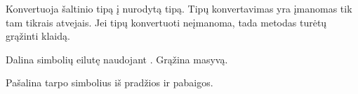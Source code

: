 \documentclass[letterpaper,10pt,lithuanian]{sphinxmanual}
\begin{document}
\begin{fulllineitems}
\begin{fulllineitems}
\end{fulllineitems}


\begin{fulllineitems}
\label{\detokenize{formules:cast}}
\pysigstartsignatures
\pysiglinewithargsret
{}
{}
{}
\pysigstopsignatures
\sphinxAtStartPar
Konvertuoja šaltinio tipą į nurodytą  tipą. Tipų konvertavimas yra
įmanomas tik tam tikrais atvejais. Jei tipų konvertuoti neįmanoma, tada
metodas turėtų grąžinti klaidą.

\end{fulllineitems}


\begin{fulllineitems}
\label{\detokenize{formules:split}}
\pysigstartsignatures
\pysiglinewithargsret
{}
{}
{}
\pysigstopsignatures
\sphinxAtStartPar
Dalina simbolių eilutę naudojant  {\hyperref[\detokenize{savokos:term-reguliarioji-israiska}]{}}. Grąžina masyvą.

\end{fulllineitems}


\begin{fulllineitems}
\label{\detokenize{formules:strip}}
\pysigstartsignatures
\pysiglinewithargsret
{}
{}
{}
\pysigstopsignatures
\sphinxAtStartPar
Pašalina tarpo simbolius iš pradžios ir pabaigos.

\end{fulllineitems}



\end{fulllineitems}
\end{document}
